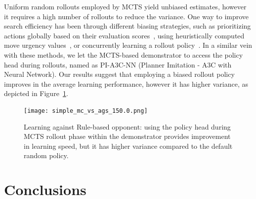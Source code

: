 \documentclass[letterpaper]{article}
\begin{document}
\vspace{-1.73mm}
Uniform random rollouts employed by MCTS yield unbiased estimates, however it requires a high number of rollouts to reduce the variance. One way to improve search efficiency has been through different biasing strategies, such as prioritizing actions globally based on their evaluation scores~\cite{kartal2014user},
using heuristically computed move urgency values~\cite{bouzy2005associating}, or concurrently learning a rollout policy~\cite{ilhan2017monte}. In a similar vein with these methods, we let the MCTS-based demonstrator to access the policy head during rollouts, named as PI-A3C-NN (Planner Imitation - A3C with Neural Network). Our results suggest that employing a biased rollout policy improves in the average learning performance, however it has higher variance, as depicted in Figure~\ref{fig:simple_rollout_biasing}.

\begin{figure}
\centering
\texttt{[image: simple\_mc\_vs\_ags\_150.0.png]}
\caption{Learning against Rule-based opponent: using the policy head during MCTS rollout phase within the demonstrator provides improvement in learning speed, but it has higher variance compared to the default random policy.}
\label{fig:simple_rollout_biasing}
\end{figure}

\vspace{-1.84mm}
\section{Conclusions}
\end{document}
